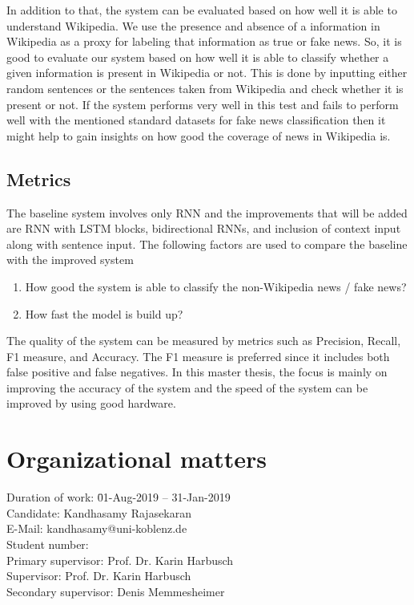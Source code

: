 \documentclass[a4paper, 11pt]{article}
\makeatletter
\newcommand{\myName}{Kandhasamy Rajasekaran}
\newcommand{\emailID}{kandhasamy@uni-koblenz.de}
\newcommand{\matriculationID}{216100855}
\newcommand{\StartDate}{01-Aug-2019}
\newcommand{\EndDate}{31-Jan-2019}
\newcommand{\supervisor}{Prof. Dr. Karin Harbusch} %
\newcommand{\secondSupervisor}{Denis Memmesheimer} %
\makeatother
\begin{document}
In addition to that, the system can be evaluated based on how well it is able to understand Wikipedia. We use the presence and absence of a information in Wikipedia as a proxy for labeling that information as true or fake news. So, it is good to evaluate our system based on how well it is able to classify whether a given information is present in Wikipedia or not. This is done by inputting either random sentences or the sentences taken from Wikipedia and check whether it is present or not. \color{red}If the system performs very well in this test and fails to perform well with the mentioned standard datasets for fake news classification then it might help to gain insights on how good the coverage of news in Wikipedia is. \color{black}

\subsection{Metrics}

The baseline system involves only RNN and the improvements that will be added are RNN with LSTM blocks, bidirectional RNNs, and inclusion of context input along with sentence input. The following factors are used to compare the baseline with the improved system
\begin{enumerate}
\item How good the system is able to classify the non-Wikipedia news / fake news?
\item How fast the model is build up?
\end{enumerate}

The quality of the system can be measured by metrics such as Precision, Recall, F1 measure, and Accuracy. The F1 measure is preferred since it includes both false positive and false negatives. In this master thesis, the focus is mainly on improving the accuracy of the system and the speed of the system can be improved by using good hardware.

\newpage

\section{Organizational matters}

\begin{tabbing}
Duration of work: \hspace{1.1cm} \= \StartDate{} -- \EndDate{}\\
\vspace{0.5ex}Candidate:	\> \myName{}\\
\vspace{0.5ex}E-Mail:	\> \emailID{}\\
\vspace{0.5ex}Student number: \> \matriculationID{}\\
\vspace{0.5ex}Primary supervisor: \> \supervisor{}\\
Supervisor: \> \supervisor{}\\
Secondary supervisor: \> \secondSupervisor{}\\
\end{tabbing}
\end{document}
